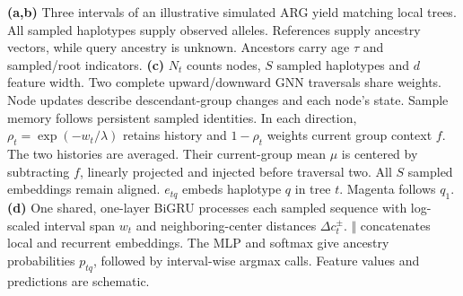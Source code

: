 \caption{\textbf{(a,b)} Three intervals of an illustrative simulated ARG yield matching local trees. All sampled haplotypes supply observed alleles. References supply ancestry vectors, while query ancestry is unknown. Ancestors carry age $\tau$ and sampled/root indicators. \textbf{(c)} $N_t$ counts nodes, $S$ sampled haplotypes and $d$ feature width. Two complete upward/downward GNN traversals share weights. Node updates describe descendant-group changes and each node's state. Sample memory follows persistent sampled identities. In each direction, $\rho_t=\exp(-w_t/\lambda)$ retains history and $1-\rho_t$ weights current group context $f$. The two histories are averaged. Their current-group mean $\mu$ is centered by subtracting $f$, linearly projected and injected before traversal two. All $S$ sampled embeddings remain aligned. $e_{tq}$ embeds haplotype $q$ in tree $t$. Magenta follows $q_1$. \textbf{(d)} One shared, one-layer BiGRU processes each sampled sequence with log-scaled interval span $w_t$ and neighboring-center distances $\Delta c_t^{\pm}$. $\Vert$ concatenates local and recurrent embeddings. The MLP and softmax give ancestry probabilities $p_{tq}$, followed by interval-wise argmax calls. Feature values and predictions are schematic.}
